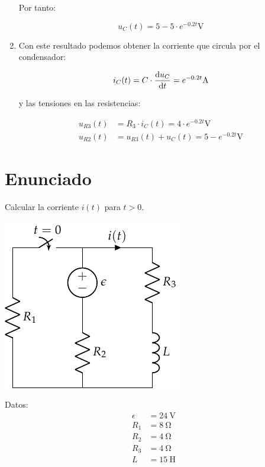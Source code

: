\begin{enumerate}
Por tanto:

\begin{equation*}
  u_C(t) = 5 - 5 \cdot e^{-0.2t} \unit{\volt}
\end{equation*}

\item Con este resultado podemos obtener la corriente que circula por
  el condensador:

\begin{equation*}
  i_C(t) = C \cdot \diff{u_C}{t} = e^{-0.2t} \unit{\ampere}
\end{equation*}

y las tensiones en las resistencias:

\begin{align*}
  u_{R3}(t) &=  R_3 \cdot i_C(t) = 4 \cdot e^{-0.2t} \unit{\volt}\\
  u_{R2}(t) &=  u_{R3}(t) + u_C(t) = 5 - e^{-0.2t} \unit{\volt}
\end{align*}
    
  
\end{enumerate}

\section{Enunciado}

Calcular la corriente $i(t)$ para $t > 0$.

\begin{minipage}{0.5\textwidth}
  \includegraphics{figuras/FM_4_2}
\end{minipage}
\hfill
\begin{minipage}{0.5\textwidth}
  Datos:
  \begin{align*}
    \epsilon &= \SI{24}{\volt}\\
    R_1 &= \SI{8}{\ohm}\\
    R_2 &= \SI{4}{\ohm}\\
    R_3 &= \SI{4}{\ohm}\\
    L &= \SI{15}{\henry}
  \end{align*}
\end{minipage}

